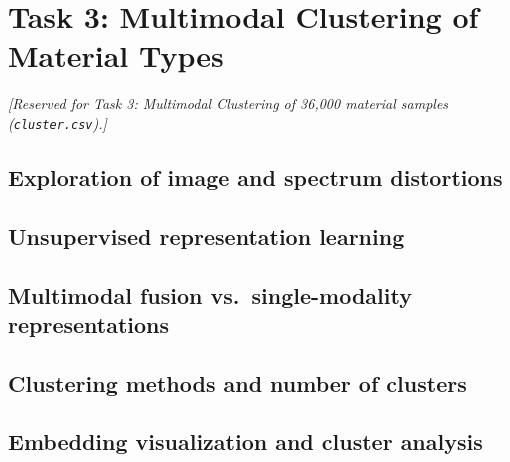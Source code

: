\section{Task 3: Multimodal Clustering of Material Types}
\label{sec:t3}

\textit{[Reserved for Task 3: Multimodal Clustering of 36{,}000 material samples
(\texttt{cluster.csv}).]}

\subsection{Exploration of image and spectrum distortions}

\subsection{Unsupervised representation learning}

\subsection{Multimodal fusion vs.\ single-modality representations}

\subsection{Clustering methods and number of clusters}

\subsection{Embedding visualization and cluster analysis}
